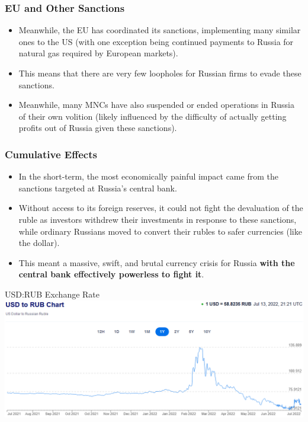 \documentclass[handout]{beamer}
\begin{document}
\begin{frame} 
	\frametitle{\LARGE{EU and Other Sanctions}}
	\begin{itemize}
		\item Meanwhile, the EU has coordinated its sanctions, implementing many similar ones to the US (with one exception being continued payments to Russia for natural gas required by European markets). \pause
		\item This means that there are very few loopholes for Russian firms to evade these sanctions. \pause
		\item Meanwhile, many MNCs have also suspended or ended operations in Russia of their own volition (likely influenced by the difficulty of actually getting profits out of Russia given these sanctions).
	\end{itemize}
\end{frame}

\begin{frame} 
	\frametitle{\LARGE{Cumulative Effects}}
	\begin{itemize}
		\item In the short-term, the most economically painful impact came from the sanctions targeted at Russia's central bank. \pause
		\item Without access to its foreign reserves, it could not fight the devaluation of the ruble as investors withdrew their investments in response to these sanctions, while ordinary Russians moved to convert their rubles to safer currencies (like the dollar). \pause
		\item This meant a massive, swift, and brutal currency crisis for Russia \textbf{with the central bank effectively powerless to fight it}. 
	\end{itemize}
\end{frame}

\begin{frame}{\LARGE USD:RUB Exchange Rate}
	\centering
	\includegraphics[width=\textwidth,height=0.9\textheight,keepaspectratio]{USDRUB.png}
\end{frame}
\end{document}
